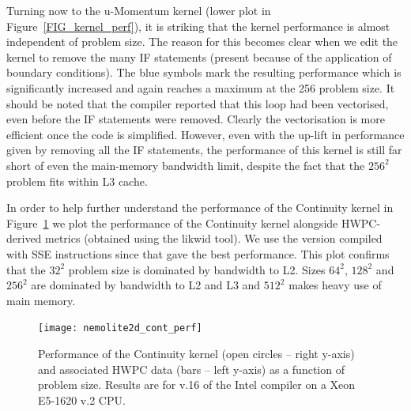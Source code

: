 \documentclass[12pt]{article}
\begin{document}
Turning now to the u-Momentum kernel (lower plot in
Figure~\ref{FIG_kernel_perf}), it is striking that the kernel
performance is almost independent of problem size. The reason for this
becomes clear when we edit the kernel to remove the many IF statements
(present because of the application of boundary conditions). The blue
symbols mark the resulting performance which is significantly
increased and again reaches a maximum at the 256 problem size.  It
should be noted that the compiler reported that this loop had been
vectorised, even before the IF statements were removed. Clearly the
vectorisation is more efficient once the code is simplified. However,
even with the up-lift in performance given by removing all the IF
statements, the performance of this kernel is still far short of even
the main-memory bandwidth limit, despite the fact that the $256^2$
problem fits within L3 cache.

In order to help further understand the performance of the Continuity
kernel in Figure~\ref{FIG_cont_perf} we plot the performance of the
Continuity kernel alongside HWPC-derived metrics (obtained using the
likwid tool). We use the version compiled with SSE instructions since
that gave the best performance. This plot confirms that the $32^2$
problem size is dominated by bandwidth to L2. Sizes $64^2$, $128^2$
and $256^2$ are dominated by bandwidth to L2 and L3 and $512^2$ makes
heavy use of main memory.

\begin{figure}
  \centering
  \texttt{[image: nemolite2d\_cont\_perf]}
  \caption{Performance of the Continuity kernel (open circles -- right y-axis)
    and associated HWPC data (bars -- left y-axis) as a function of
    problem size. Results are for v.16 of the Intel compiler on a Xeon
    E5-1620 v.2 CPU.}
  \label{FIG_cont_perf}
\end{figure}
\end{document}
